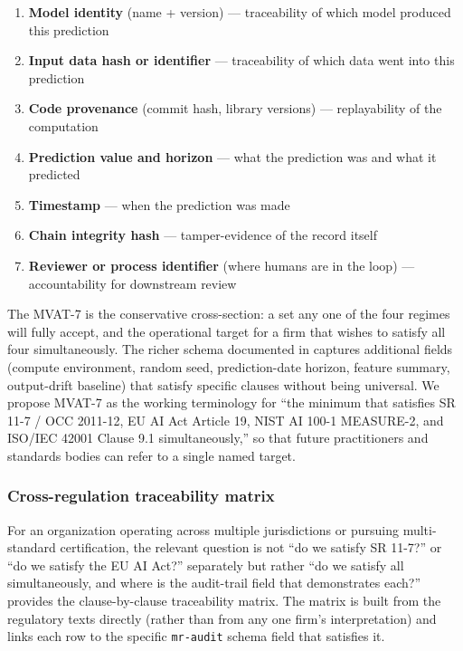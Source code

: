 \begin{enumerate}[leftmargin=*, label=\textbf{MVAT-\arabic*}]
    \item \textbf{Model identity} (name + version) \hfill --- traceability of which model produced this prediction
    \item \textbf{Input data hash or identifier} \hfill --- traceability of which data went into this prediction
    \item \textbf{Code provenance} (commit hash, library versions) \hfill --- replayability of the computation
    \item \textbf{Prediction value and horizon} \hfill --- what the prediction was and what it predicted
    \item \textbf{Timestamp} \hfill --- when the prediction was made
    \item \textbf{Chain integrity hash} \hfill --- tamper-evidence of the record itself
    \item \textbf{Reviewer or process identifier} (where humans are in the loop) \hfill --- accountability for downstream review
\end{enumerate}

The MVAT-7 is the conservative cross-section: a set any one of the four regimes will fully accept, and the operational target for a firm that wishes to satisfy all four simultaneously. The richer schema documented in  captures additional fields (compute environment, random seed, prediction-date horizon, feature summary, output-drift baseline) that satisfy specific clauses without being universal. We propose MVAT-7 as the working terminology for ``the minimum that satisfies SR 11-7 / OCC 2011-12, EU AI Act Article 19, NIST AI 100-1 MEASURE-2, and ISO/IEC 42001 Clause 9.1 simultaneously,'' so that future practitioners and standards bodies can refer to a single named target.

\subsubsection{Cross-regulation traceability matrix}\label{sec:cross_regulation}

For an organization operating across multiple jurisdictions or pursuing multi-standard certification, the relevant question is not ``do we satisfy SR 11-7?'' or ``do we satisfy the EU AI Act?'' separately but rather ``do we satisfy all simultaneously, and where is the audit-trail field that demonstrates each?''  provides the clause-by-clause traceability matrix. The matrix is built from the regulatory texts directly (rather than from any one firm's interpretation) and links each row to the specific \texttt{mr-audit} schema field that satisfies it.

